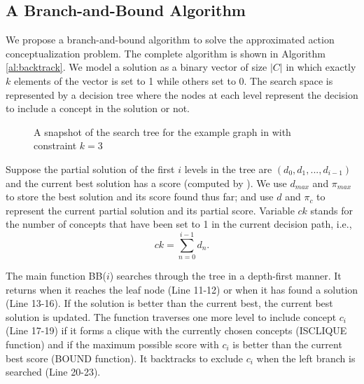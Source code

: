 \subsection{A Branch-and-Bound Algorithm}
We propose a branch-and-bound algorithm to solve the approximated
action conceptualization problem.
The complete algorithm is shown in Algorithm \ref{al:backtrack}.
We model a solution as a binary vector of size $|C|$ in which exactly
$k$ elements of the vector is set to 1 while others set to 0.
The search space is represented by a decision tree
where the nodes at each level represent the decision to include a concept in
the solution or not. 

\begin{figure}[th]
\centering
{}
\caption{A snapshot of the search tree for the
example graph in  with constraint $k=3$}
\label{fig:search_tree}
\end{figure}

Suppose the partial solution of the first $i$ levels in the tree
are $(d_0, d_1, ..., d_{i-1})$ and
the current best solution has a score (computed by ).
We use $d_{max}$ and $\pi_{max}$ to store the
best solution and its score found thus far; and use $d$ and $\pi_{c}$ to
represent the current partial solution and its partial score.
Variable $ck$ stands for the number of concepts that have been set to
1 in the current decision path, i.e.,
\[ck=\sum_{n=0}^{i-1}d_n.\]

The main function BB($i$) searches through the tree in a depth-first manner.
It returns when it reaches the leaf node (Line 11-12) or when it has found a
solution (Line 13-16). If the solution is better than the current best,
the current best solution is updated. The function traverses one
more level to include concept $c_i$ (Line 17-19) if it forms
a clique with the currently chosen concepts (ISCLIQUE function)
and if the maximum possible score with $c_i$ is better than
the current best score (BOUND function). It backtracks to exclude $c_i$
when the left branch is searched (Line 20-23).

